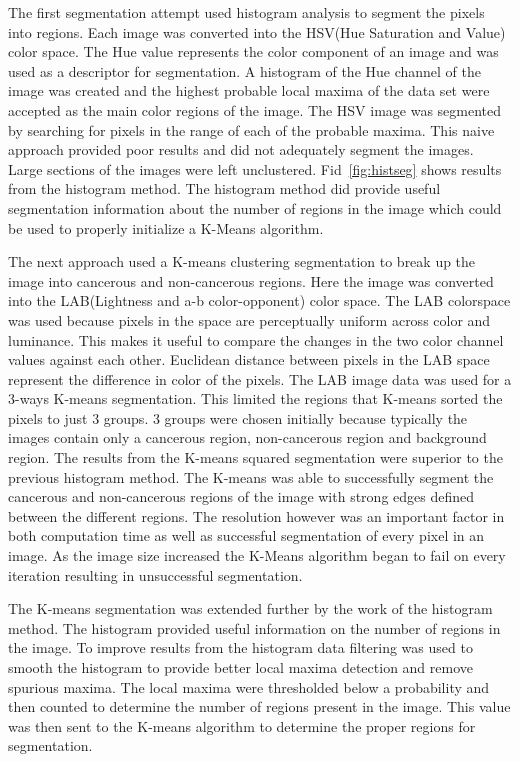 \documentclass[letterpaper,10pt,oneside]{article}
\begin{document}
The first segmentation attempt used histogram analysis to segment the pixels into regions. Each image was converted into the HSV(Hue Saturation and Value) color space. The Hue value represents the color component of an image and was used as a descriptor for segmentation. A histogram of the Hue channel of the image was created and the highest probable local maxima of the data set were accepted as the main color regions of the image. The HSV image was segmented by searching for pixels in the range of each of the probable maxima. This naive approach provided poor results and did not adequately segment the images. Large sections of the images were left unclustered. Fid~\ref{fig:histseg} shows results from the histogram method. The histogram method did provide useful segmentation information about the number of regions in the image which could be used to properly initialize a K-Means algorithm.

The next approach used a K-means clustering segmentation to break up the image into cancerous and non-cancerous regions. Here the image was converted into the LAB(Lightness and a-b color-opponent) color space. The LAB colorspace was used because pixels in the space are perceptually uniform across color and luminance. This makes it useful to compare the changes in the two color channel values against each other. Euclidean distance between pixels in the LAB space represent the difference in color of the pixels. The LAB image data was used for a 3-ways K-means segmentation. This limited the regions that K-means sorted the pixels to just 3 groups. 3 groups were chosen initially because typically the images contain only a cancerous region, non-cancerous region and background region. The results from the K-means squared segmentation were superior to the previous histogram method. The K-means was able to successfully segment the cancerous and non-cancerous regions of the image with strong edges defined between the different regions. The resolution however was an important factor in both computation time as well as successful segmentation of every pixel in an image. As the image size increased the K-Means algorithm began to fail on every iteration resulting in unsuccessful segmentation.

The K-means segmentation was extended further by the work of the histogram method. The histogram provided useful information on the number of regions in the image. To improve results from the histogram data filtering was used to smooth the histogram to provide better local maxima detection and remove spurious maxima. The local maxima were thresholded below a probability and then counted to determine the number of regions present in the image. This value was then sent to the K-means algorithm to determine the proper regions for segmentation.
\end{document}
